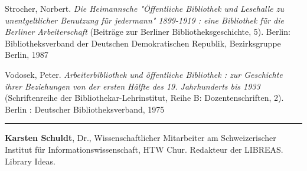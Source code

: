 \documentclass[a4paper,
fontsize=11pt,
oneside,
numbers=noperiodatend,
parskip=half-,
bibliography=totoc,
final
]{scrartcl}
\begin{document}
Strocher, Norbert. \emph{Die Heimannsche "Öffentliche Bibliothek und
Lesehalle zu unentgeltlicher Benutzung für jedermann" 1899-1919 : eine
Bibliothek für die Berliner Arbeiterschaft} (Beiträge zur Berliner
Bibliotheksgeschichte, 5). Berlin: Bibliotheksverband der Deutschen
Demokratischen Republik, Bezirksgruppe Berlin, 1987

Vodosek, Peter. \emph{Arbeiterbibliothek und öffentliche Bibliothek :
zur Geschichte ihrer Beziehungen von der ersten Hälfte des 19.
Jahrhunderts bis 1933} (Schriftenreihe der Bibliothekar-Lehrinstitut,
Reihe B: Dozentenschriften, 2). Berlin : Deutscher Bibliotheksverband,
1975

\begin{center}\rule{0.5\linewidth}{\linethickness}\end{center}

\textbf{Karsten Schuldt}, Dr., Wissenschaftlicher Mitarbeiter am
Schweizerischer Institut für Informationswissenschaft, HTW Chur.
Redakteur der LIBREAS. Library Ideas.
\end{document}
